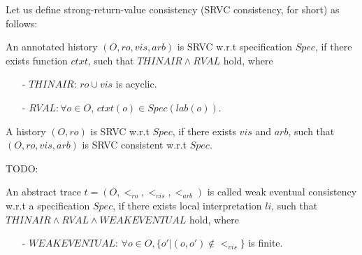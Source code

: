 Let us define strong-return-value consistency (SRVC consistency, for short) as follows:


\begin{definition}
\label{definition:strong return value consistency}
An annotated history $(O,\mathit{ro},\mathit{vis},\mathit{arb})$ is SRVC w.r.t specification $Spec$, if there exists function $ctxt$, such that $\mathit{THINAIR} \wedge \mathit{RVAL}$ hold, where 

\begin{itemize}
\setlength{\itemsep}{0.5pt}
\item[-] $\mathit{THINAIR}$: $\mathit{ro} \cup \mathit{vis}$ is acyclic.

\item[-] $\mathit{RVAL}: \forall o \in O$, $ctxt(o) \in Spec(lab(o))$.
\end{itemize}

A history $(O,\mathit{ro})$ is SRVC w.r.t $Spec$, if there exists $\mathit{vis}$ and $\mathit{arb}$, such that $(O,\mathit{ro},\mathit{vis},\mathit{arb})$ is SRVC consistent w.r.t $Spec$.
\end{definition}


{\color {blue}TODO:

\begin{definition}
\label{definition:eventual consistency}
An abstract trace $t = (O,<_{\mathit{ro}},<_{\mathit{vis}},<_{\mathit{arb}})$ is called weak eventual consistency w.r.t a specification $Spec$, if there exists local interpretation $li$, such that $\mathit{THINAIR} \wedge \mathit{RVAL} \wedge \mathit{WEAKEVENTUAL}$ hold, where

\begin{itemize}
\setlength{\itemsep}{0.5pt}
\item[-] $\mathit{WEAKEVENTUAL}$: $\forall o \in O, \{ o' \vert (o,o') \notin <_{\mathit{vis}} \}$ is finite.
\end{itemize}
\end{definition}

}














